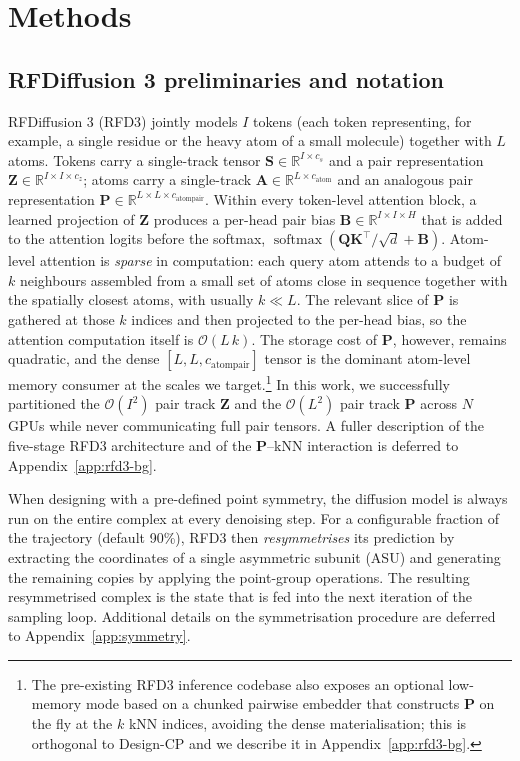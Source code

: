 \documentclass{article}
\theoremstyle{plain}
\theoremstyle{definition}
\theoremstyle{remark}
\begin{document}
\section{Methods}
\label{sec:methods}

\subsection{RFDiffusion 3 preliminaries and notation}
\label{sec:prelims}

RFDiffusion 3 (RFD3) jointly models $I$ tokens (each token representing, for example, a single residue or the heavy atom of a small molecule) together with $L$ atoms. Tokens carry a single-track tensor $\mathbf{S}\in\mathbb{R}^{I\times c_s}$ and a pair representation $\mathbf{Z}\in\mathbb{R}^{I\times I\times c_z}$; atoms carry a single-track $\mathbf{A}\in\mathbb{R}^{L\times c_\text{atom}}$ and an analogous pair representation $\mathbf{P}\in\mathbb{R}^{L\times L\times c_\text{atompair}}$. Within every token-level attention block, a learned projection of $\mathbf{Z}$ produces a per-head pair bias $\mathbf{B}\in\mathbb{R}^{I\times I\times H}$ that is added to the attention logits before the softmax, $\operatorname{softmax}(\mathbf{Q}\mathbf{K}^{\top}/\sqrt{d}+\mathbf{B})$. Atom-level attention is \emph{sparse} in computation: each query atom attends to a budget of $k$ neighbours assembled from a small set of atoms close in sequence together with the spatially closest atoms, with usually $k\!\ll\!L$. The relevant slice of $\mathbf{P}$ is gathered at those $k$ indices and then projected to the per-head bias, so the attention computation itself is $\mathcal{O}(L\,k)$. The storage cost of $\mathbf{P}$, however, remains quadratic, and the dense $[L,L,c_\text{atompair}]$ tensor is the dominant atom-level memory consumer at the scales we target.\footnote{The pre-existing RFD3 inference codebase also exposes an optional low-memory mode based on a chunked pairwise embedder that constructs $\mathbf{P}$ on the fly at the $k$ kNN indices, avoiding the dense materialisation; this is orthogonal to Design-CP and we describe it in Appendix~\ref{app:rfd3-bg}.} In this work, we successfully partitioned the $\mathcal{O}(I^{2})$ pair track $\mathbf{Z}$ and the $\mathcal{O}(L^{2})$ pair track $\mathbf{P}$ across $N$ GPUs while never communicating full pair tensors. A fuller description of the five-stage RFD3 architecture and of the $\mathbf{P}$--kNN interaction is deferred to Appendix~\ref{app:rfd3-bg}.

When designing with a pre-defined point symmetry, the diffusion model is always run on the entire complex at every denoising step. For a configurable fraction of the trajectory (default 90\%), RFD3 then \emph{resymmetrises} its prediction by extracting the coordinates of a single asymmetric subunit (ASU) and generating the remaining copies by applying the point-group operations. The resulting resymmetrised complex is the state that is fed into the next iteration of the sampling loop. Additional details on the symmetrisation procedure are deferred to Appendix~\ref{app:symmetry}.
\end{document}
